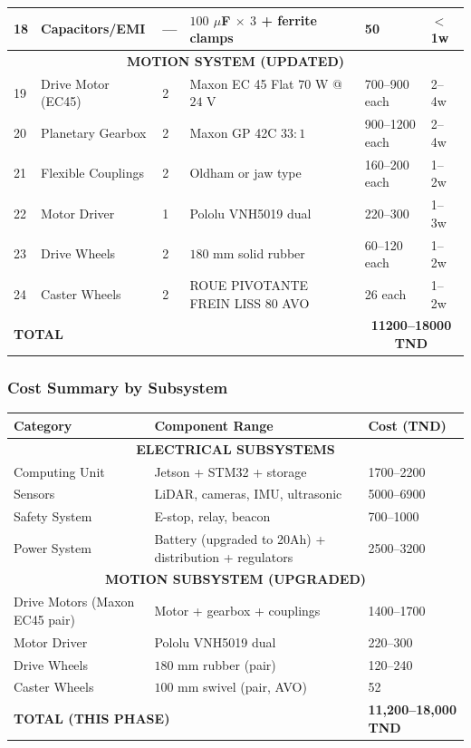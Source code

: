 \documentclass[12pt,a4paper]{article}
\begin{document}
\begin{longtable}{|p{1.2cm}|p{3.5cm}|p{1.5cm}|p{2cm}|p{1.5cm}|p{1cm}|}
\hline
18 & Capacitors/EMI & --- & $100$ $\mu$F $\times$ $3$ + ferrite clamps & 50 & $<$1w \\
\hline
\multicolumn{6}{|c|}{\textbf{MOTION SYSTEM (UPDATED)}} \\
\hline
19 & Drive Motor (EC45) & 2 & Maxon EC 45 Flat $70$ W @ $24$ V & 700--900 each & 2--4w \\
\hline
20 & Planetary Gearbox & 2 & Maxon GP 42C $33:1$ & 900--1200 each & 2--4w \\
\hline
21 & Flexible Couplings & 2 & Oldham or jaw type & 160--200 each & 1--2w \\
\hline
22 & Motor Driver & 1 & Pololu VNH5019 dual & 220--300 & 1--3w \\
\hline
23 & Drive Wheels & 2 & $180$ mm solid rubber & 60--120 each & 1--2w \\
\hline
24 & Caster Wheels & 2 & ROUE PIVOTANTE FREIN LISS 80 AVO & 26 each & 1--2w \\
\hline
\hline
\multicolumn{3}{|l|}{\textbf{TOTAL}} & & \multicolumn{2}{|c|}{\textbf{11200--18000 TND}} \\
\hline

\end{longtable}
\newpage
\subsubsection{Cost Summary by Subsystem}

\begin{longtable}{|p{3.5cm}|p{4cm}|p{3cm}|}
\hline
\textbf{Category} & \textbf{Component Range} & \textbf{Cost (TND)} \\
\hline
\multicolumn{3}{|c|}{\textbf{ELECTRICAL SUBSYSTEMS}} \\
\hline
Computing Unit & Jetson + STM32 + storage & 1700--2200 \\
\hline
Sensors & LiDAR, cameras, IMU, ultrasonic & 5000--6900 \\
\hline
Safety System & E-stop, relay, beacon & 700--1000 \\
\hline
Power System & Battery (upgraded to 20Ah) + distribution + regulators & 2500--3200 \\
\hline
\multicolumn{3}{|c|}{\textbf{MOTION SUBSYSTEM (UPGRADED)}} \\
\hline
Drive Motors (Maxon EC45 pair) & Motor + gearbox + couplings & 1400--1700 \\
\hline
Motor Driver & Pololu VNH5019 dual & 220--300 \\
\hline
Drive Wheels & $180$ mm rubber (pair) & 120--240 \\
\hline
Caster Wheels & $100$ mm swivel (pair, AVO) & 52 \\
\hline
\hline
\multicolumn{2}{|l|}{\textbf{TOTAL (THIS PHASE)}} & \textbf{11,200--18,000 TND} \\
\hline
\end{longtable}
\end{document}
